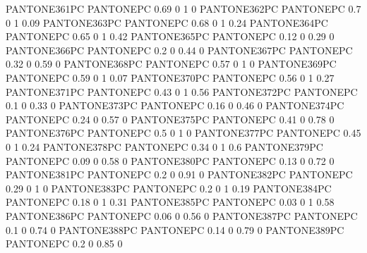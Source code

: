  {PANTONE361PC} {PANTONE\SpotSpace PC} {0.69 0 1 0}
 {PANTONE362PC} {PANTONE\SpotSpace PC} {0.7 0 1 0.09}
 {PANTONE363PC} {PANTONE\SpotSpace PC} {0.68 0 1 0.24}
 {PANTONE364PC} {PANTONE\SpotSpace PC} {0.65 0 1 0.42}
 {PANTONE365PC} {PANTONE\SpotSpace PC} {0.12 0 0.29 0}
 {PANTONE366PC} {PANTONE\SpotSpace PC} {0.2 0 0.44 0}
 {PANTONE367PC} {PANTONE\SpotSpace PC} {0.32 0 0.59 0}
 {PANTONE368PC} {PANTONE\SpotSpace PC} {0.57 0 1 0}
 {PANTONE369PC} {PANTONE\SpotSpace PC} {0.59 0 1 0.07}
 {PANTONE370PC} {PANTONE\SpotSpace PC} {0.56 0 1 0.27}
 {PANTONE371PC} {PANTONE\SpotSpace PC} {0.43 0 1 0.56}
 {PANTONE372PC} {PANTONE\SpotSpace PC} {0.1 0 0.33 0}
 {PANTONE373PC} {PANTONE\SpotSpace PC} {0.16 0 0.46 0}
 {PANTONE374PC} {PANTONE\SpotSpace PC} {0.24 0 0.57 0}
 {PANTONE375PC} {PANTONE\SpotSpace PC} {0.41 0 0.78 0}
 {PANTONE376PC} {PANTONE\SpotSpace PC} {0.5 0 1 0}
 {PANTONE377PC} {PANTONE\SpotSpace PC} {0.45 0 1 0.24}
 {PANTONE378PC} {PANTONE\SpotSpace PC} {0.34 0 1 0.6}
 {PANTONE379PC} {PANTONE\SpotSpace PC} {0.09 0 0.58 0}
 {PANTONE380PC} {PANTONE\SpotSpace PC} {0.13 0 0.72 0}
 {PANTONE381PC} {PANTONE\SpotSpace PC} {0.2 0 0.91 0}
 {PANTONE382PC} {PANTONE\SpotSpace PC} {0.29 0 1 0}
 {PANTONE383PC} {PANTONE\SpotSpace PC} {0.2 0 1 0.19}
 {PANTONE384PC} {PANTONE\SpotSpace PC} {0.18 0 1 0.31}
 {PANTONE385PC} {PANTONE\SpotSpace PC} {0.03 0 1 0.58}
 {PANTONE386PC} {PANTONE\SpotSpace PC} {0.06 0 0.56 0}
 {PANTONE387PC} {PANTONE\SpotSpace PC} {0.1 0 0.74 0}
 {PANTONE388PC} {PANTONE\SpotSpace PC} {0.14 0 0.79 0}
 {PANTONE389PC} {PANTONE\SpotSpace PC} {0.2 0 0.85 0}
